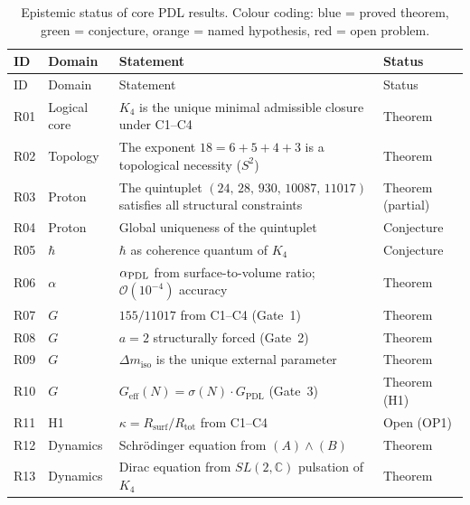 \documentclass[11pt,a4paper]{article}
\theoremstyle{plain}
\theoremstyle{definition}
\theoremstyle{remark}
\newcommand{\PDL}{\textnormal{PDL}}
\newcommand{\Kfour}{K_4}
\newcommand{\quintuplet}{(24,\,28,\,930,\,10087,\,11017)}
\newcommand{\Geff}{G_{\mathrm{eff}}}
\newcommand{\GPDL}{G_{\mathrm{PDL}}}
\newcommand{\Rsurf}{R_{\mathrm{surf}}}
\newcommand{\Rtot}{R_{\mathrm{tot}}}
\newcommand{\sigmaN}{\sigma(N)}
\begin{document}
\begin{longtable}{@{}L{0.7cm}L{2.5cm}L{6.5cm}L{2.5cm}@{}}
\caption{Epistemic status of core PDL results.
Colour coding: \textcolor{proofblue}{blue} = proved theorem, \textcolor{conjecturegreen}{green} = conjecture, \textcolor{hypothesisorange}{orange} = named hypothesis, \textcolor{openproblemred}{red} = open problem.}
\label{tab:status}\\
\toprule
ID & Domain & Statement & Status \\
\midrule
\endfirsthead
\toprule
ID & Domain & Statement & Status \\
\midrule
\endhead
\bottomrule
\endfoot

R01 & Logical core & $\Kfour$ is the unique minimal admissible closure under C1--C4 & \textcolor{proofblue}{Theorem} \\[0.3em]
R02 & Topology & The exponent $18=6+5+4+3$ is a topological necessity ($S^2$) & \textcolor{proofblue}{Theorem} \\[0.3em]
R03 & Proton & The quintuplet $\quintuplet$ satisfies all structural constraints & \textcolor{proofblue}{Theorem (partial)} \\[0.3em]
R04 & Proton & Global uniqueness of the quintuplet & \textcolor{conjecturegreen}{Conjecture} \\[0.3em]
R05 & $\hbar$ & $\hbar$ as coherence quantum of $\Kfour$ & \textcolor{conjecturegreen}{Conjecture} \\[0.3em]
R06 & $\alpha$ & $\alpha_{\PDL}$ from surface-to-volume ratio; $\mathcal{O}(10^{-4})$ accuracy & \textcolor{proofblue}{Theorem} \\[0.3em]
R07 & $G$ & $155/11017$ from C1--C4 (Gate~1) & \textcolor{proofblue}{Theorem} \\[0.3em]
R08 & $G$ & $a=2$ structurally forced (Gate~2) & \textcolor{proofblue}{Theorem} \\[0.3em]
R09 & $G$ & $\Delta m_{\mathrm{iso}}$ is the unique external parameter & \textcolor{proofblue}{Theorem} \\[0.3em]
R10 & $G$ & $\Geff(N)=\sigmaN\cdot\GPDL$ (Gate~3) & \textcolor{proofblue}{Theorem (H1)} \\[0.3em]
R11 & H1 & $\kappa=\Rsurf/\Rtot$ from C1--C4 & \textcolor{openproblemred}{Open (OP1)} \\[0.3em]
R12 & Dynamics & Schr\"odinger equation from $(A)\wedge(B)$ & \textcolor{proofblue}{Theorem} \\[0.3em]
R13 & Dynamics & Dirac equation from $SL(2,\mathbb{C})$ pulsation of $\Kfour$ & \textcolor{proofblue}{Theorem} \\[0.3em]

\end{longtable}
\end{document}
